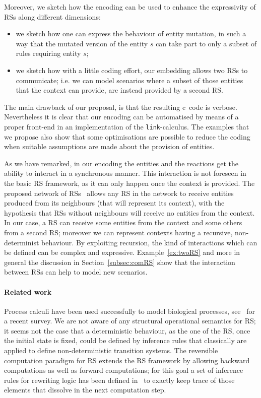 Moreover, we sketch how the encoding can be used to enhance the expressivity of RSs along different dimensions:
\begin{itemize}
\item we sketch how one can express the behaviour of entity mutation,
in such a way that the mutated version of the entity
$s$ can  take part to only a subset of rules requiring entity $s$;
\item we sketch how with a little coding effort, our 
embedding
allows two RSs to
communicate; i.e. we can model scenarios where a subset of those entities that the context  can
provide, are instead provided by a second RS.
\end{itemize}

The main drawback of our proposal, is that the resulting c\CNA \ 
code
is
verbose. Nevertheless it is clear that our
encoding
can be automatised by means of a proper front-end in
an implementation of the {\tt link}-calculus. 
The examples that we propose also show that some optimisations are possible
to reduce the coding when suitable assumptions are made about the provision of entities.

As we have remarked, in our 
encoding
the entities and the reactions
get the ability to interact in a synchronous manner. 
This interaction is not foreseen in
the basic RS framework, as it can only happen once the context is provided.
The proposed network of RSs~\cite{BLR20} allows
any RS in the network to receive entities 
produced from its neighbours (that will represent its context), with the hypothesis that  
RSs without neighbours will receive no entities 
from the context. 
In our case, a RS can receive some entities from the context and some others from a second RS; moreover we can represent contexts having a recursive, non-determinist behaviour.
%
By exploiting recursion, the kind of interactions which can be 
defined can be complex and expressive.
Example~\ref{ex:twoRS} and more in general the discussion in 
Section~\ref{subsec:comRS}
 show that 
the interaction between RSs can help to model new scenarios.

\paragraph{Related work}

Process calculi have been used successfully to model
biological processes, see~\cite{BBDFH18} for a recent survey.
We are not aware of any 
structural operational semantics for RS; it seems not the case
that a deterministic behaviour, as the one of the RS, once the initial state is 
fixed, could be defined by inference rules that classically are applied 
to define non-deterministic transition systems.
The reversible computation paradigm for RS extends the RS framework  by
allowing  backward computations as well as forward computations; for this 
goal a set of inference rules for rewriting logic has been 
defined in~\cite{10.1007/978-3-319-73359-3_3}
to exactly keep trace of those elements that  dissolve in the next 
computation step.


